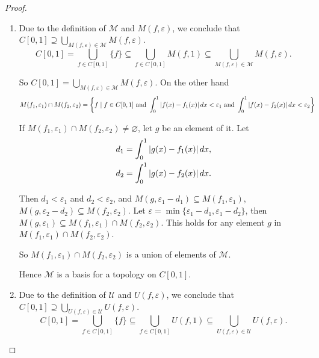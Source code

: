 \begin{proof}
	\begin{enumerate}[label={(\roman*)}]
		\item Due to the definition of $\mathcal{M}$ and $M(f, \varepsilon)$, we conclude that $C[0, 1] \supseteq \bigcup_{M(f, \varepsilon)\in \mathcal{M}} M(f, \varepsilon)$.
		      \[
			      C[0, 1] = \bigcup_{f\in C[0, 1]} \{ f \} \subseteq \bigcup_{f\in C[0, 1]} M(f, 1) \subseteq \bigcup_{M(f, \varepsilon)\in \mathcal{M}} M(f, \varepsilon).
		      \]

		      So $C[0, 1] = \bigcup_{M(f, \varepsilon)\in \mathcal{M}} M(f, \varepsilon)$. On the other hand
		      \begin{align*}
			      M(f_{1}, \varepsilon_{1})\cap M(f_{2}, \varepsilon_{2}) & = \left\{ f \mid f\in C[0, 1] \text{ and } \int^{1}_{0}\left\vert{f(x) - f_{1}(x)}\right\vert dx < \varepsilon_{1} \text{ and } \int^{1}_{0}\left\vert{f(x) - f_{2}(x)}\right\vert dx < \varepsilon_{2} \right\}
		      \end{align*}

		      If $M(f_{1}, \varepsilon_{1})\cap M(f_{2}, \varepsilon_{2})\ne \varnothing$, let $g$ be an element of it. Let
		      \[
			      \begin{split}
				      d_{1} = \int^{1}_{0}\left\vert{g(x) - f_{1}(x)}\right\vert dx, \\
				      d_{2} = \int^{1}_{0}\left\vert{g(x) - f_{2}(x)}\right\vert dx.
			      \end{split}
		      \]

		      Then $d_{1} < \varepsilon_{1}$ and $d_{2} < \varepsilon_{2}$, and $M(g, \varepsilon_{1} - d_{1})\subseteq M(f_{1}, \varepsilon_{1})$, $M(g, \varepsilon_{2} - d_{2})\subseteq M(f_{2}, \varepsilon_{2})$. Let $\varepsilon = \min\{ \varepsilon_{1} - d_{1}, \varepsilon_{1} - d_{2} \}$, then $M(g, \varepsilon_{1})\subseteq M(f_{1}, \varepsilon_{1})\cap M(f_{2}, \varepsilon_{2})$. This holds for any element $g$ in $M(f_{1}, \varepsilon_{1})\cap M(f_{2}, \varepsilon_{2})$.

		      So $M(f_{1}, \varepsilon_{1})\cap M(f_{2}, \varepsilon_{2})$ is a union of elements of $\mathcal{M}$.

		      Hence $\mathcal{M}$ is a basis for a topology on $C[0, 1]$.
		\item Due to the definition of $\mathcal{U}$ and $U(f, \varepsilon)$, we conclude that $C[0, 1]\supseteq \bigcup_{U(f, \varepsilon)\in \mathcal{U}} U(f, \varepsilon)$.
		      \[
			      C[0, 1] = \bigcup_{f\in C[0, 1]} \{ f \} \subseteq \bigcup_{f\in C[0, 1]} U(f, 1) \subseteq \bigcup_{U(f, \varepsilon)\in \mathcal{U}} U(f, \varepsilon).
		      \]


\end{enumerate}
\end{proof}
